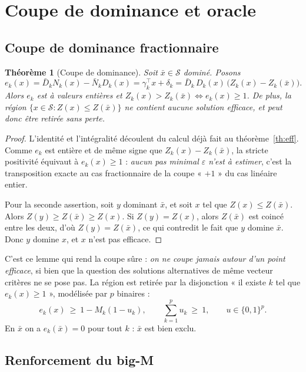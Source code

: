 \documentclass[11pt,a4paper]{article}
\theoremstyle{plain}
\newtheorem{theorem}{Théorème}
\theoremstyle{remark}
\newcommand{\Zk}{Z_k}
\newcommand{\Nk}{N_k}
\newcommand{\Dk}{D_k}
\newcommand{\Scal}{\mathcal{S}}
\begin{document}
\section{Coupe de dominance et oracle}

\subsection{Coupe de dominance fractionnaire}

\begin{theorem}[Coupe de dominance]\label{th:cut}
Soit $\bar x\in\Scal$ \emph{dominé}. Posons
\[
  e_k(x)=\bar D_k\Nk(x)-\bar N_k\Dk(x)
        =\gamma_k^{\!\top}x+\delta_k
        =\bar D_k\,\Dk(x)\,\bigl(\Zk(x)-\Zk(\bar x)\bigr).
\]
Alors $e_k$ est à valeurs entières et
$\Zk(x)>\Zk(\bar x)\iff e_k(x)\ge 1$. De plus, la région
$\{x\in\Scal : Z(x)\le Z(\bar x)\}$ ne contient aucune solution efficace, et
peut donc être retirée sans perte.
\end{theorem}

\begin{proof}
L'identité et l'intégralité découlent du calcul déjà fait au
théorème~\ref{th:eff}. Comme $e_k$ est entière et de même signe que
$\Zk(x)-\Zk(\bar x)$, la stricte positivité équivaut à $e_k(x)\ge 1$ :
\emph{aucun pas minimal $\varepsilon$ n'est à estimer}, c'est la transposition
exacte au cas fractionnaire de la coupe « $+1$ » du cas linéaire entier.

Pour la seconde assertion, soit $y$ dominant $\bar x$, et soit $x$ tel que
$Z(x)\le Z(\bar x)$. Alors $Z(y)\ge Z(\bar x)\ge Z(x)$. Si $Z(y)=Z(x)$, alors
$Z(\bar x)$ est coincé entre les deux, d'où $Z(y)=Z(\bar x)$, ce qui
contredit le fait que $y$ domine $\bar x$. Donc $y$ domine $x$, et $x$ n'est
pas efficace.
\end{proof}

\noindent
C'est ce lemme qui rend la coupe sûre : \emph{on ne coupe jamais autour d'un
point efficace}, si bien que la question des solutions alternatives de même
vecteur critères ne se pose pas. La région est retirée par la disjonction
« il existe $k$ tel que $e_k(x)\ge 1$ », modélisée par $p$ binaires :
\[
  e_k(x)\ \ge\ 1-M_k(1-u_k),\qquad \sum_{k=1}^p u_k\ \ge\ 1,
  \qquad u\in\{0,1\}^p .
\]
En $\bar x$ on a $e_k(\bar x)=0$ pour tout $k$ : $\bar x$ est bien exclu.

\subsection{Renforcement du big-M}
\end{document}
